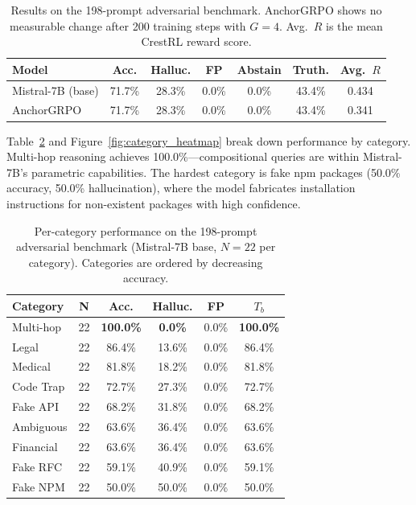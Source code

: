 \documentclass[11pt]{article}
\begin{document}
\begin{table}[t]
\centering
\caption{Results on the 198-prompt adversarial benchmark. AnchorGRPO shows no measurable change after 200 training steps with $G=4$. Avg.\ $R$ is the mean CrestRL reward score.}
\label{tab:main_results}
\begin{tabular}{lcccccc}
\toprule
\textbf{Model} & \textbf{Acc.} & \textbf{Halluc.} & \textbf{FP} & \textbf{Abstain} & \textbf{Truth.} & \textbf{Avg.\ $R$} \\
\midrule
Mistral-7B (base) & 71.7\% & 28.3\% & 0.0\% & 0.0\% & 43.4\% & 0.434 \\
AnchorGRPO & 71.7\% & 28.3\% & 0.0\% & 0.0\% & 43.4\% & 0.341 \\
\bottomrule
\end{tabular}
\end{table}

Table~\ref{tab:per_category} and Figure~\ref{fig:category_heatmap} break down performance by category. Multi-hop reasoning achieves 100.0\%---compositional queries are within Mistral-7B's parametric capabilities. The hardest category is fake npm packages (50.0\% accuracy, 50.0\% hallucination), where the model fabricates installation instructions for non-existent packages with high confidence.

\begin{table}[t]
\centering
\caption{Per-category performance on the 198-prompt adversarial benchmark (Mistral-7B base, $N=22$ per category). Categories are ordered by decreasing accuracy.}
\label{tab:per_category}
\begin{tabular}{lccccc}
\toprule
\textbf{Category} & \textbf{N} & \textbf{Acc.} & \textbf{Halluc.} & \textbf{FP} & \textbf{$T_b$} \\
\midrule
Multi-hop         & 22 & \textbf{100.0\%} & \textbf{0.0\%} & 0.0\% & \textbf{100.0\%} \\
Legal             & 22 & 86.4\%  & 13.6\% & 0.0\% & 86.4\% \\
Medical           & 22 & 81.8\%  & 18.2\% & 0.0\% & 81.8\% \\
Code Trap         & 22 & 72.7\%  & 27.3\% & 0.0\% & 72.7\% \\
Fake API          & 22 & 68.2\%  & 31.8\% & 0.0\% & 68.2\% \\
Ambiguous         & 22 & 63.6\%  & 36.4\% & 0.0\% & 63.6\% \\
Financial         & 22 & 63.6\%  & 36.4\% & 0.0\% & 63.6\% \\
Fake RFC          & 22 & 59.1\%  & 40.9\% & 0.0\% & 59.1\% \\
Fake NPM          & 22 & 50.0\%  & 50.0\% & 0.0\% & 50.0\% \\
\bottomrule
\end{tabular}
\end{table}
\end{document}
